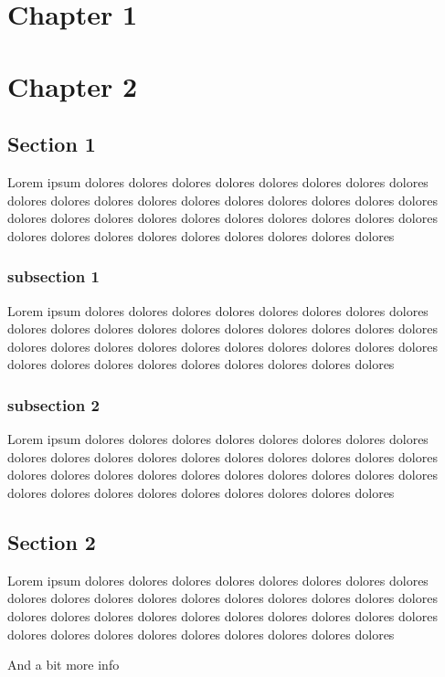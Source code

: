 \chapter{Chapter 1}
\label{chap:included}

\chapter{Chapter 2}
\label{chap:sibling}

\section{Section 1}
\label{sec:section}

Lorem ipsum dolores dolores dolores dolores dolores dolores dolores dolores dolores dolores dolores dolores dolores dolores dolores dolores dolores dolores dolores dolores dolores dolores dolores dolores dolores dolores dolores dolores dolores dolores dolores dolores dolores dolores dolores dolores dolores 

\subsection{subsection 1}
\label{subsec:subsection}
Lorem ipsum dolores dolores dolores dolores dolores dolores dolores dolores dolores dolores dolores dolores dolores dolores dolores dolores dolores dolores dolores dolores dolores dolores dolores dolores dolores dolores dolores dolores dolores dolores dolores dolores dolores dolores dolores dolores dolores 

\subsection{subsection 2}
\label{subsec:sibling-subsection}
Lorem ipsum dolores dolores dolores dolores dolores dolores dolores dolores dolores dolores dolores dolores dolores dolores dolores dolores dolores dolores dolores dolores dolores dolores dolores dolores dolores dolores dolores dolores dolores dolores dolores dolores dolores dolores dolores dolores dolores 

\section{Section 2}
\label{sec:another}
Lorem ipsum dolores dolores dolores dolores dolores dolores dolores dolores dolores dolores dolores dolores dolores dolores dolores dolores dolores dolores dolores dolores dolores dolores dolores dolores dolores dolores dolores dolores dolores dolores dolores dolores dolores dolores dolores dolores dolores 

And a bit more info